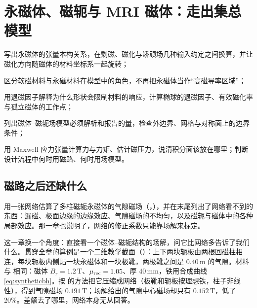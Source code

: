 \chapter{永磁体、磁轭与 MRI 磁体：走出集总模型}\label{ch:magnets}

\begin{chapterguide}
\begin{guidegoals}
\item 写出永磁体的张量本构关系，在剩磁、磁化与矫顽场几种输入约定之间换算，并让磁化方向随磁体的材料坐标系一起旋转；
\item 区分软磁材料与永磁材料在模型中的角色，不再把永磁体当作“高磁导率区域”；
\item 用退磁因子解释为什么形状会限制材料的响应，计算椭球的退磁因子、有效磁化率与孤立磁体的工作点；
\item 列出磁体--磁轭场模型必须解析和报告的量，检查外边界、网格与对称面上的边界条件；
\item 用 Maxwell 应力张量计算力与力矩、估计磁压力，说清积分面该放在哪里；判断设计流程中何时用磁路、何时用场模型。
\end{guidegoals}
\end{chapterguide}

\section{磁路之后还缺什么}\label{sec:magnets-question}

 用一张网络估算了多柱磁轭永磁体的气隙磁场（，），并在末尾列出了网络看不到的东西：漏磁、极面边缘的边缘效应、气隙磁场的不均匀，以及磁轭与磁体中的各种局部效应。那一章也说明了，网络的修正系数只能靠场解来标定。

这一章换一个角度：直接看一个磁体--磁轭结构的场解，问它比网络多告诉了我们什么。贯穿全章的算例是一个二维教学截面（）：上下两块轭板由两根回磁柱相连，每块轭板内侧贴一块永磁体和一块极靴，两极靴之间是 $0.40\,\mathrm m$ 的气隙。材料与 相同：磁体 $B_r=1.2\,\mathrm T$、$\mu_{\rm rec}=1.05$、厚 $40\,\mathrm{mm}$，铁用合成曲线 \eqref{eq:syntheticbh}。按 的方法把它压缩成网络（极靴和轭板按理想铁，柱子非线性），得到气隙磁场 $0.191\,\mathrm T$；场解给出的气隙中心磁场却只有 $0.152\,\mathrm T$，低了 20\%。差额去了哪里，网络本身无从回答。

